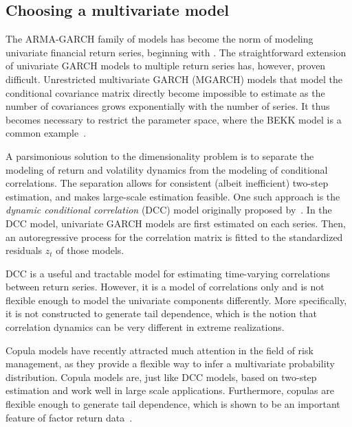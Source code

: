 
\subsection{Choosing a multivariate model}
\label{sub:05_01_choosing}
The ARMA-GARCH family of models has become the norm of modeling univariate financial return series, beginning with \textcite{Bollerslev1986}. The straightforward extension of univariate GARCH models to multiple return series has, however, proven difficult. Unrestricted multivariate GARCH (MGARCH) models that model the conditional covariance matrix directly become impossible to estimate as the number of covariances grows exponentially with the number of series. It thus becomes necessary to restrict the parameter space, where the BEKK model is a common example~\autocite{BEKKModel}.

A parsimonious solution to the dimensionality problem is to separate the modeling of return and volatility dynamics from the modeling of conditional correlations. The separation allows for consistent (albeit inefficient) two-step estimation, and makes large-scale estimation feasible. One such approach is the \emph{dynamic conditional correlation} (DCC) model originally proposed by~\autocite{Engle2002}. In the DCC model, univariate GARCH models are first estimated on each series. Then, an autoregressive process for the correlation matrix is fitted to the standardized residuals ${z_t}$ of those models. 

DCC is a useful and tractable model for estimating time-varying correlations between return series. However, it is a model of correlations only and is not flexible enough to model the univariate components differently. More specifically, it is not constructed to generate tail dependence, which is the notion that correlation dynamics can be very different in extreme realizations. 

Copula models have recently attracted much attention in the field of risk management, as they provide a flexible way to infer a multivariate probability distribution. Copula models are, just like DCC models, based on two-step estimation and work well in large scale applications. Furthermore, copulas are flexible enough to generate tail dependence, which is shown to be an important feature of factor return data~\autocite{ChristoffersenLanglois2013}. 

